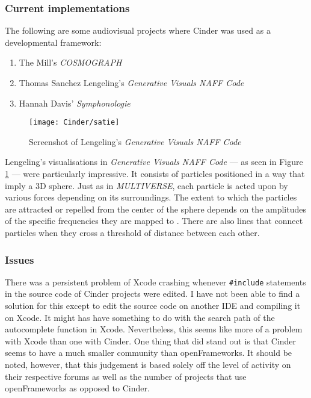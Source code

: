\documentclass[../../initial_thesis.tex]{subfiles}
\begin{document}
\subsubsection{Current implementations}
The following are some audiovisual projects where Cinder was used as a developmental framework:

\begin{enumerate}
\item The Mill's \textit{COSMOGRAPH} \cite{TheMill}
\item Thomas Sanchez Lengeling's \textit{Generative Visuals NAFF Code} \cite{Lengeling}
\item Hannah Davis' \textit{Symphonologie} \cite{HannahDavis2016}
\end{enumerate}
\begin{figure}
  \centering
  \texttt{[image: Cinder/satie]}
  \caption{Screenshot of Lengeling's \textit{Generative Visuals NAFF Code}}
  \label{fig:lengeling}
\end{figure}

Lengeling's visualisations in \textit{Generative Visuals NAFF Code} --- as seen in Figure \ref{fig:lengeling} --- were particularly impressive. It consists of particles positioned in a way that imply a 3D sphere. Just as in \textit{MULTIVERSE}, each particle is acted upon by various forces depending on its surroundings. The extent to which the particles are attracted or repelled from the center of the sphere depends on the amplitudes of the specific frequencies they are mapped to \cite{Sanchez}. There are also lines that connect particles when they cross a threshold of distance between each other.

\subsubsection{Issues}
There was a persistent problem of Xcode crashing whenever \verb|#include| statements in the source code of Cinder projects were edited. I have not been able to find a solution for this except to edit the source code on another IDE and compiling it on Xcode. It might has have something to do with the search path of the autocomplete function in Xcode. Nevertheless, this seems like more of a problem with Xcode than one with Cinder. One thing that did stand out is that Cinder seems to have a much smaller community than openFrameworks. It should be noted, however, that this judgement is based solely off the level of activity on their respective forums as well as the number of projects that use openFrameworks as opposed to Cinder.
\end{document}

